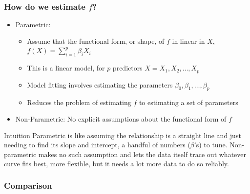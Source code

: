 \begin{frame}[fragile]\frametitle{How do we estimate $f$?}
\begin{itemize}
\item Parametric:
	\begin{itemize}
	\item Assume that the functional form, or shape, of $f$ in linear in $X$, $f(X) = \sum_{i=1}^p \beta_i X_i$
	\item This is a linear model, for $p$ predictors $X = {X_1, X_2,\ldots, X_p}$
	\item Model fitting involves estimating the parameters $\beta_0, \beta_1,\ldots,\beta_p$
	\item Reduces the problem of estimating $f$ to estimating a set of parameters
	\end{itemize}
\item Non-Parametric: No explicit assumptions about the functional form of $f$
\end{itemize}
\begin{block}{Intuition}
Parametric is like assuming the relationship is a straight line and just needing to find its slope and intercept, a handful of numbers ($\beta$'s) to tune. Non-parametric makes no such assumption and lets the data itself trace out whatever curve fits best, more flexible, but it needs a lot more data to do so reliably.
\end{block}
\end{frame}

\begin{frame}[fragile] \frametitle{Comparison}

\hfill
{}
\end{frame}

